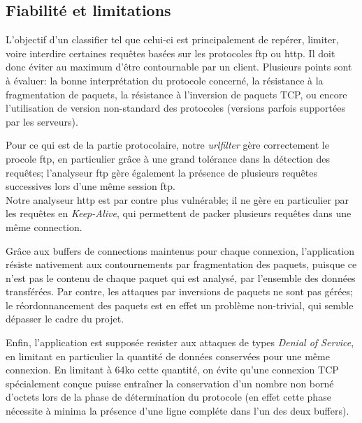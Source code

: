 \subsection{Fiabilité et limitations}
  L'objectif d'un classifier tel que celui-ci est principalement de repérer, limiter, voire interdire certaines requêtes basées sur les protocoles ftp ou http.
  Il doit donc éviter au maximum d'être contournable par un client. Plusieurs points sont à évaluer: la bonne interprétation du protocole concerné, la résistance à la
  fragmentation de paquets, la résistance à l'inversion de paquets TCP, ou encore l'utilisation de version non-standard des protocoles (versions parfois supportées par
  les serveurs).
  
  Pour ce qui est de la partie protocolaire, notre \emph{urlfilter} gère correctement le procole ftp, en particulier grâce à une grand tolérance dans la détection
  des requêtes; l'analyseur ftp gère également la présence de plusieurs requêtes successives lors d'une même session ftp.\\
  Notre analyseur http est par contre plus vulnérable; il ne gère en particulier par les requêtes en \emph{Keep-Alive}, qui permettent de packer plusieurs requêtes dans une
  même connection.
  
  Grâce aux buffers de connections maintenus pour chaque connexion, l'application résiste nativement aux contournements par fragmentation des paquets, puisque ce n'est pas le
  contenu de chaque paquet qui est analysé, par l'ensemble des données transférées. Par contre, les attaques par inversions de paquets ne sont pas gérées; le réordonnancement
  des paquets est en effet un problème non-trivial, qui semble dépasser le cadre du projet.
  
  Enfin, l'application est supposée resister aux attaques de types \emph{Denial of Service}, en limitant en particulier la quantité de données conservées pour une même connexion.
  En limitant à 64ko cette quantité, on évite qu'une connexion TCP spécialement conçue puisse entraîner la conservation d'un nombre non borné d'octets lors de la phase de
  détermination du protocole (en effet cette phase nécessite à minima la présence d'une ligne compléte dans l'un des deux buffers).
